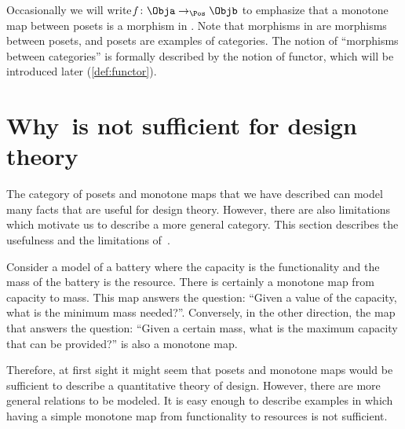 Occasionally we will write$f \colon \Obja \to_{\Pos} \Objb$ to emphasize that a monotone map between posets is a morphism in \Pos. Note that morphisms in \Pos are morphisms between posets, and posets are examples of categories. The notion of ``morphisms between categories'' is formally described by the notion of functor, which will be introduced later (\cref{def:functor}).

\section{Why~\Pos is not sufficient for design theory}

The category \Pos of posets and monotone maps that we have described can model many facts that are useful for design theory. However, there are also limitations which motivate us to describe a more general category. This section describes the usefulness and the limitations of~\Pos.

\begin{example}[Battery]
Consider a model of a battery where the capacity is the functionality and the mass of the battery is the resource.
There is certainly a monotone map from capacity to mass. This map answers the question: ``Given a value of the capacity, what is the minimum mass needed?''. Conversely, in the other direction, the map that answers the question: ``Given a certain mass, what is the maximum capacity that can be provided?'' is also a monotone map.
\end{example}

\begin{comment}
\begin{figure}[h!]
    \centering
    \begin{tikzcd}
    \bullet &\arrow[l] \bullet\\[-15pt]
    \text{mass} & \text{capacity}
    \end{tikzcd}
    \caption{Example of the design of a battery. \label{fig:battery-example}}
\end{figure}
\end{comment}

Therefore, at first sight it might seem that posets and monotone maps would be sufficient to describe a quantitative theory of design. However, there are more general relations to be modeled. It is easy enough to describe examples in which having a simple monotone map from functionality to resources is not sufficient.

